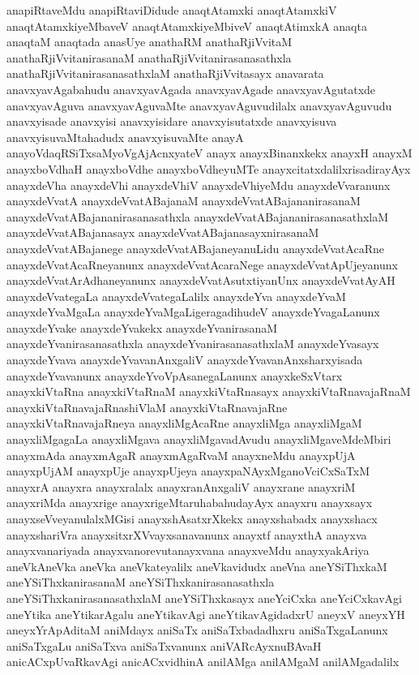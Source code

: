 {anapiRtaveMdu
anapiRtaviDidude
anaqtAtamxki
anaqtAtamxkiV
anaqtAtamxkiyeMbaveV
anaqtAtamxkiyeMbiveV
anaqtAtimxkA
anaqta
anaqtaM
anaqtada
anasUye
anathaRM
anathaRjiVvitaM
anathaRjiVvitanirasanaM
anathaRjiVvitanirasanasathxla
anathaRjiVvitanirasanasathxlaM
anathaRjiVvitasayx
anavarata
anavxyavAgabahudu
anavxyavAgada
anavxyavAgade
anavxyavAgutatxde
anavxyavAguva
anavxyavAguvaMte
anavxyavAguvudilalx
anavxyavAguvudu
anavxyisade
anavxyisi
anavxyisidare
anavxyisutatxde
anavxyisuva
anavxyisuvaMtahadudx
anavxyisuvaMte
anayA
anayoVdaqRSiTxsaMyoVgAjAcnxyateV
anayx
anayxBinanxkekx
anayxH
anayxM
anayxboVdhaH
anayxboVdhe
anayxboVdheyuMTe
anayxcitatxdalilxrisadirayAyx
anayxdeVha
anayxdeVhi
anayxdeVhiV
anayxdeVhiyeMdu
anayxdeVvaranunx
anayxdeVvatA
anayxdeVvatABajanaM
anayxdeVvatABajananirasanaM
anayxdeVvatABajananirasanasathxla
anayxdeVvatABajananirasanasathxlaM
anayxdeVvatABajanasayx
anayxdeVvatABajanasayxnirasanaM
anayxdeVvatABajanege
anayxdeVvatABajaneyanuLidu
anayxdeVvatAcaRne
anayxdeVvatAcaRneyanunx
anayxdeVvatAcaraNege
anayxdeVvatApUjeyanunx
anayxdeVvatArAdhaneyanunx
anayxdeVvatAsutxtiyanUnx
anayxdeVvatAyAH
anayxdeVvategaLa
anayxdeVvategaLalilx
anayxdeYva
anayxdeYvaM
anayxdeYvaMgaLa
anayxdeYvaMgaLigeragadihudeV
anayxdeYvagaLanunx
anayxdeYvake
anayxdeYvakekx
anayxdeYvanirasanaM
anayxdeYvanirasanasathxla
anayxdeYvanirasanasathxlaM
anayxdeYvasayx
anayxdeYvava
anayxdeYvavanAnxgaliV
anayxdeYvavanAnxsharxyisada
anayxdeYvavanunx
anayxdeYvoVpAsanegaLanunx
anayxkeSxVtarx
anayxkiVtaRna
anayxkiVtaRnaM
anayxkiVtaRnasayx
anayxkiVtaRnavajaRnaM
anayxkiVtaRnavajaRnashiVlaM
anayxkiVtaRnavajaRne
anayxkiVtaRnavajaRneya
anayxliMgAcaRne
anayxliMga
anayxliMgaM
anayxliMgagaLa
anayxliMgava
anayxliMgavadAvudu
anayxliMgaveMdeMbiri
anayxmAda
anayxmAgaR
anayxmAgaRvaM
anayxneMdu
anayxpUjA
anayxpUjAM
anayxpUje
anayxpUjeya
anayxpaNAyxMganoVciCxSaTxM
anayxrA
anayxra
anayxralalx
anayxranAnxgaliV
anayxrane
anayxriM
anayxriMda
anayxrige
anayxrigeMtaruhabahudayAyx
anayxru
anayxsayx
anayxseVveyanulalxMGisi
anayxshAsatxrXkekx
anayxshabadx
anayxshacx
anayxshariVra
anayxsitxrXVvayxsanavanunx
anayxtf
anayxthA
anayxva
anayxvanariyada
anayxvanorevutanayxvana
anayxveMdu
anayxyakAriya
aneVkAneVka
aneVka
aneVkateyalilx
aneVkavidudx
aneVna
aneYSiThxkaM
aneYSiThxkanirasanaM
aneYSiThxkanirasanasathxla
aneYSiThxkanirasanasathxlaM
aneYSiThxkasayx
aneYciCxka
aneYciCxkavAgi
aneYtika
aneYtikarAgalu
aneYtikavAgi
aneYtikavAgidadxrU
aneyxV
aneyxYH
aneyxYrApAditaM
aniMdayx
aniSaTx
aniSaTxbadadhxru
aniSaTxgaLanunx
aniSaTxgaLu
aniSaTxva
aniSaTxvanunx
aniVARcAyxnuBAvaH
anicACxpUvaRkavAgi
anicACxvidhinA
anilAMga
anilAMgaM
anilAMgadalilx
}
